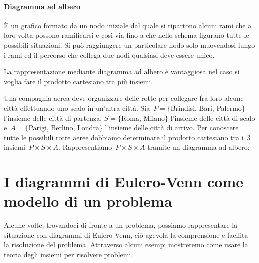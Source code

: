 \paragraph{Diagramma ad albero}
\`E un grafico formato da un nodo iniziale dal quale si ripartono alcuni
rami che a loro volta possono ramificarsi e così via fino a che nello
schema figurano tutte le possibili situazioni.
Si può raggiungere un particolare nodo solo muovendosi lungo i rami ed
il percorso che collega due nodi qualsiasi deve essere unico.

La rappresentazione mediante diagramma ad albero è vantaggiosa nel
caso si voglia fare il prodotto cartesiano tra più insiemi.
\begin{center}

\end{center}

\begin{exrig}
 \begin{esempio}
 Una compagnia aerea deve organizzare delle rotte per collegare fra loro alcune città effettuando uno scalo
in un'altra città. Sia~$P=\{$Brindisi, Bari, Palermo$\}$ l'insieme delle città di
partenza, $S=\{$Roma, Milano$\}$ l'insieme delle città di
scalo e~$A=\{$Parigi, Berlino, Londra$\}$ l'insieme delle città di
arrivo. Per conoscere tutte le possibili rotte aeree dobbiamo
determinare il prodotto cartesiano tra i~3 insiemi~$P\times S\times A$.
Rappresentiamo~$P\times S\times A$ tramite un diagramma ad albero:
\begin{center}

\end{center}
 \end{esempio}
\end{exrig}

\section{I diagrammi di Eulero-Venn come modello di un problema}
Alcune volte, trovandoci di fronte a un problema, possiamo rappresentare
la situazione con diagrammi di Eulero-Venn, ciò agevola la
comprensione e facilita la risoluzione del problema. Attraverso alcuni
esempi mostreremo come usare la teoria degli insiemi per risolvere
problemi.

